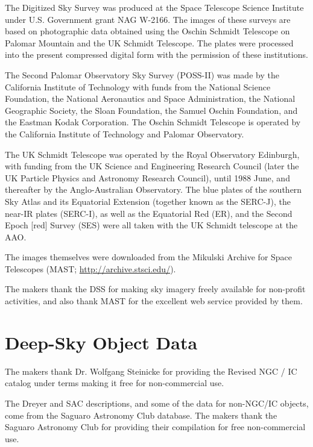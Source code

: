 The Digitized Sky Survey was produced at the Space Telescope Science
Institute under U.S. Government grant NAG W-2166. The images of these
surveys are based on photographic data obtained using the Oschin
Schmidt Telescope on Palomar Mountain and the UK Schmidt
Telescope. The plates were processed into the present compressed
digital form with the permission of these institutions.

The Second Palomar Observatory Sky Survey (POSS-II) was made by the
California Institute of Technology with funds from the National
Science Foundation, the National Aeronautics and Space Administration,
the National Geographic Society, the Sloan Foundation, the Samuel
Oschin Foundation, and the Eastman Kodak Corporation. The Oschin
Schmidt Telescope is operated by the California Institute of
Technology and Palomar Observatory.

The UK Schmidt Telescope was operated by the Royal Observatory
Edinburgh, with funding from the UK Science and Engineering Research
Council (later the UK Particle Physics and Astronomy Research
Council), until 1988 June, and thereafter by the Anglo-Australian
Observatory. The blue plates of the southern Sky Atlas and its
Equatorial Extension (together known as the SERC-J), the near-IR
plates (SERC-I), as well as the Equatorial Red (ER), and the Second
Epoch [red] Survey (SES) were all taken with the UK Schmidt telescope
at the AAO.

The images themselves were downloaded from the Mikulski Archive for
Space Telescopes (MAST; \url{http://archive.stsci.edu/}).

The makers thank the DSS for making sky imagery freely available for
non-profit activities, and also thank MAST for the excellent web
service provided by them.

\section*{Deep-Sky Object Data}

The makers thank Dr. Wolfgang Steinicke for providing the Revised NGC
/ IC catalog under terms making it free for non-commercial use.

The Dreyer and SAC descriptions, and some of the data for non-NGC/IC
objects, come from the Saguaro Astronomy Club database. The makers
thank the Saguaro Astronomy Club for providing their compilation for
free non-commercial use.
\clearpage
